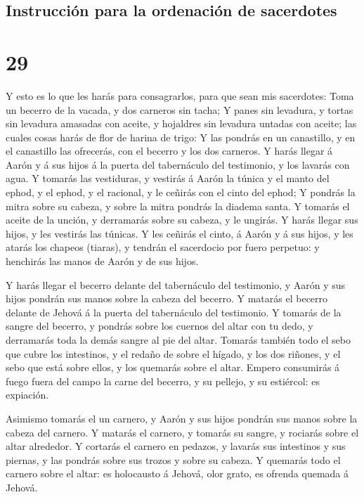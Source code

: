 \hypertarget{instrucciuxf3n-para-la-ordenaciuxf3n-de-sacerdotes}{%
\subsection{Instrucción para la ordenación de
sacerdotes}\label{instrucciuxf3n-para-la-ordenaciuxf3n-de-sacerdotes}}

\hypertarget{section-28}{%
\section{29}\label{section-28}}

 Y esto es lo que les harás para consagrarlos, para que
sean mis sacerdotes: Toma un becerro de la vacada, y dos carneros sin
tacha;  Y panes sin levadura, y tortas sin levadura
amasadas con aceite, y hojaldres sin levadura untadas con aceite; las
cuales cosas harás de flor de harina de trigo:  Y las
pondrás en un canastillo, y en el canastillo las ofrecerás, con el
becerro y los dos carneros.  Y harás llegar á Aarón y á
sus hijos á la puerta del tabernáculo del testimonio, y los lavarás con
agua.  Y tomarás las vestiduras, y vestirás á Aarón la
túnica y el manto del ephod, y el ephod, y el racional, y le ceñirás con
el cinto del ephod;  Y pondrás la mitra sobre su cabeza, y
sobre la mitra pondrás la diadema santa.  Y tomarás el
aceite de la unción, y derramarás sobre su cabeza, y le ungirás.
 Y harás llegar sus hijos, y les vestirás las túnicas.
 Y les ceñirás el cinto, á Aarón y á sus hijos, y les
atarás los chapeos (tiaras), y tendrán el sacerdocio por fuero perpetuo:
y henchirás las manos de Aarón y de sus hijos.

 Y harás llegar el becerro delante del tabernáculo del
testimonio, y Aarón y sus hijos pondrán sus manos sobre la cabeza del
becerro.  Y matarás el becerro delante de Jehová á la
puerta del tabernáculo del testimonio.  Y tomarás de la
sangre del becerro, y pondrás sobre los cuernos del altar con tu dedo, y
derramarás toda la demás sangre al pie del altar. 
Tomarás también todo el sebo que cubre los intestinos, y el redaño de
sobre el hígado, y los dos riñones, y el sebo que está sobre ellos, y
los quemarás sobre el altar.  Empero consumirás á fuego
fuera del campo la carne del becerro, y su pellejo, y su estiércol: es
expiación.

 Asimismo tomarás el un carnero, y Aarón y sus hijos
pondrán sus manos sobre la cabeza del carnero.  Y matarás
el carnero, y tomarás su sangre, y rociarás sobre el altar alrededor.
 Y cortarás el carnero en pedazos, y lavarás sus
intestinos y sus piernas, y las pondrás sobre sus trozos y sobre su
cabeza.  Y quemarás todo el carnero sobre el altar: es
holocausto á Jehová, olor grato, es ofrenda quemada á Jehová.

